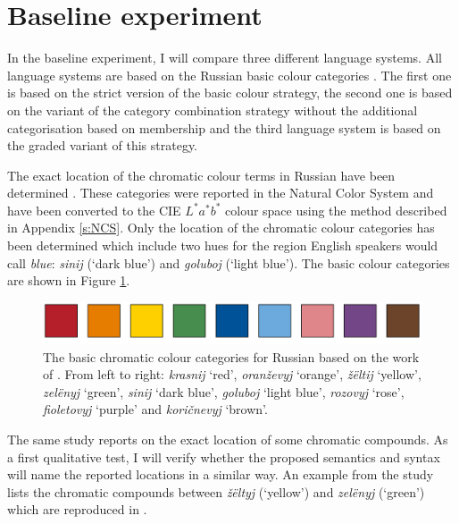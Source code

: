 \section{Baseline experiment}

In the baseline experiment, I will compare three different language
systems. All language systems are based on the Russian basic colour
categories \citep{safuanova07russian}. The first one is based on the
strict version of the basic colour strategy, the second one is
based on the variant of the category combination strategy
without the additional categorisation based on membership and the
third language system is based on the graded variant of this strategy.

The exact location of the chromatic colour terms in Russian have been
determined \citep{safuanova07russian}. These categories were reported
in the Natural Color System and have been converted to the CIE
$L^*a^*b^*$ colour space using the method described in Appendix
\ref{s:NCS}. Only the location of the chromatic colour categories has
been determined which include two hues for the region English speakers
would call \textit{blue}: \textit{sinij} (`dark blue') and \textit{goluboj} (`light
blue'). The basic colour categories are shown in Figure
\ref{f:ccs-russian-basic}.

\begin{figure}[htpb]
  \centering
  \includegraphics[height=1.25cm]{./category-combination/figures/russian-basic-categories.pdf}
  \caption[The basic chromatic colour categories for Russian]{The
    basic chromatic colour categories for Russian based on the work of
    \citeauthor{safuanova07russian}. From left to right: \textit{krasnij}
    `red', \textit{oran\v zevyj} `orange', \textit{\v z\"eltij} `yellow', \textit{zel\"enyj}
    `green', \textit{sinij} `dark blue', \textit{goluboj} `light blue',
    \textit{rozovyj} `rose', \textit{fioletovyj} `purple' and \textit{kori\v cnevyj}
    `brown'.}
  \label{f:ccs-russian-basic}
\end{figure}

The same study reports on the exact location of some chromatic
compounds. As a first qualitative test, I will verify whether the
proposed semantics and syntax will name the reported locations in a
similar way. An example from the study lists the chromatic compounds
between \textit{\v z\"eltyj} (`yellow') and \textit{zel\"enyj} (`green') which are
reproduced in .

